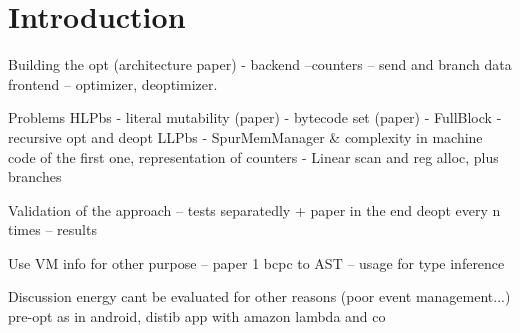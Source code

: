 \documentclass[a4paper,12pt,twoside]{../includes/ThesisStyle}
\begin{document}
\fi

\chapter{Introduction }
\label{chap:intro}
\minitoc

Building the opt (architecture paper)
- backend	
--counters
-- send and branch data
frontend
-- optimizer, deoptimizer.

Problems
HLPbs
- literal mutability (paper)
- bytecode set (paper)
- FullBlock
- recursive opt and deopt
LLPbs
- SpurMemManager & complexity in machine code of the first one, representation of counters
- Linear scan and reg alloc, plus branches

Validation of the approach
-- tests separatedly + paper in the end deopt every n times
-- results

Use VM info for other purpose
-- paper 1 bcpc to AST
-- usage for type inference

Discussion energy cant be evaluated  for other reasons (poor event management...) pre-opt as in android, distib app with amazon lambda and co

\ifx\wholebook\relax\else
    
\end{document}
